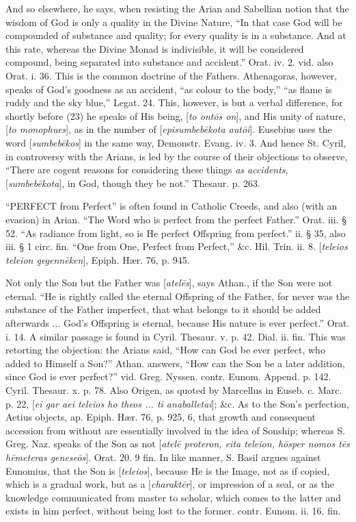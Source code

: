 And so elsewhere, he says, when resisting the
Arian and Sabellian notion that the wisdom of God is only a quality in
the Divine Nature, ``In that case God will be compounded of substance
and quality; for every quality is in a substance. And at this
rate, whereas the Divine Monad is indivisible, it will be considered
compound, being separated into substance and accident.'' Orat. iv. 2.
vid. also Orat. i. 36. This is the common doctrine of the Fathers.
Athenagoras, however, speaks of God's goodness as an accident, ``as
colour to the body,'' ``as flame is ruddy and the sky blue,'' Legat. 24.
This, however, is but a verbal difference, for shortly before (23) he
speaks of His being, [\emph{to ont\={o}s on}], and His unity of
nature, [\emph{to monophues}], as in the number of [\emph{episumbeb\={e}kota
aut\={o}i}]. Eusebius uses the word [\emph{sumbeb\={e}kos}]
in the same way, Demonstr. Evang. iv. 3. And hence St. Cyril, in
controversy with the Arians, is led by the course of their objections
to observe, ``There are cogent reasons for considering these things \emph{as
accidents}, [\emph{sumbeb\={e}kota}], in God, though they be
not.'' Thesaur. p. 263.


``PERFECT
from Perfect'' is often found in Catholic Creeds, and also (with an
evasion) in Arian. ``The Word who is perfect from the perfect Father.''
Orat. iii. § 52. ``As radiance from light, so is He perfect Offspring
from perfect.'' ii. § 35, also iii. § 1 circ. fin. ``One from One,
Perfect from Perfect,'' \&c. Hil. Trin. ii. 8. [\emph{teleios teleion
gegenn\={e}ken}], Epiph. Hær. 76, p. 945.

Not only the Son but the Father was [\emph{atel\={e}s}],
says Athan., if the Son were not eternal. ``He is rightly called the
eternal Offspring of the Father, for never was the substance of the
Father imperfect, that what belongs to it should be added afterwards
... God's Offspring is eternal, because His nature is ever perfect.''
Orat. i. 14. A similar passage is found in Cyril. Thesaur. v. p. 42.
Dial. ii. fin. This was retorting the objection: the Arians said, ``How
can God be ever perfect, who added to Himself a Son?'' Athan. answers, ``How
can the Son be a later addition, since God is ever perfect?'' vid.
Greg. Nyssen. contr. Eunom. Append. p. 142. Cyril. Thesaur. x. p. 78.
Also Origen, as quoted by Marcellus in Euseb. c. Marc. p. 22, [\emph{ei
gar aei teleios ho theos ... ti anaballetai}]; \&c. As to the
Son's perfection, Aetius objects, ap. Epiph. Hær. 76, p. 925, 6, that
growth and consequent accession from without are essentially involved
in the idea of Sonship; whereas S. Greg. Naz. speaks of the Son
as not [\emph{atel\={e} proteron, eita teleion, h\={o}sper nomos t\={e}s
h\={e}meteras genese\={o}s}]. Orat. 20. 9 fin. In like
manner, S. Basil argues against Eunomius, that the Son is [\emph{teleios}],
because He is the Image, not as if copied, which is a gradual work,
but as a [\emph{charakt\={e}r}], or impression of a seal, or as the
knowledge communicated from master to scholar, which comes to the
latter and exists in him perfect, without being lost to the former.
contr. Eunom. ii. 16. fin.

